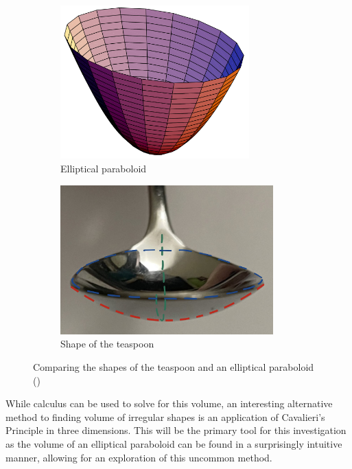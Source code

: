 \documentclass[12pt]{article}
\begin{document}
\begin{figure}[h]
     \centering
     \begin{subfigure}[b]{0.45\textwidth}
         \centering
         \includegraphics[width=0.8\textwidth]{images/ep.png}
         \caption{Elliptical paraboloid}
         \label{fig:ep}
     \end{subfigure}
     \hfill
     \begin{subfigure}[b]{0.45\textwidth}
         \centering
         \includegraphics[width=0.9\textwidth]{images/sppon is ep.jpg}
         \caption{Shape of the teaspoon}
         \label{fig:tps.ep}
     \end{subfigure}
     \hfill
        \caption{Comparing the shapes of the teaspoon and an elliptical paraboloid (\citeauthor{weisstein})}
        \label{fig:epp}
\end{figure}

While calculus can be used to solve for this volume, an interesting alternative method to finding volume of irregular shapes is an application of Cavalieri's Principle in three dimensions. This will be the primary tool for this investigation as the volume of an elliptical paraboloid can be found in a surprisingly intuitive manner, allowing for an exploration of this uncommon method.  
\end{document}
